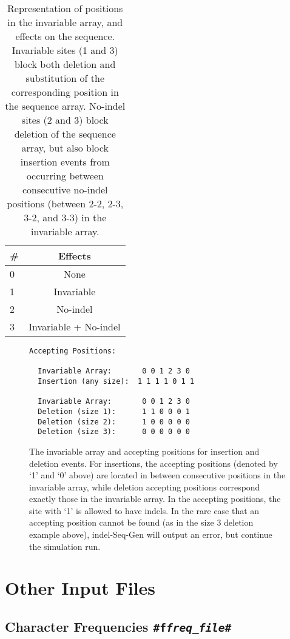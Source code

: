 \documentclass[10pt]{article}
\begin{document}
\begin{table}[Htbp]
\caption{Representation of positions in the invariable array, and effects on the sequence.
Invariable sites (1 and 3) block both deletion and substitution of the corresponding position in the sequence array.  No-indel sites (2 and 3) block deletion of the sequence array, but also block insertion events from occurring between consecutive no-indel positions (between 2-2, 2-3, 3-2, and 3-3) in the invariable array.}
\centering
\begin{tabular}{|l|c|}
\hline
\# & Effects \\
\hline
0 & None \\
1 & Invariable \\
2 & No-indel \\
3 & Invariable + No-indel  \\
\hline
\end{tabular}
\label{tab:invariable}
\end{table}

\begin{figure}[Htbp]
\begin{verbatim}
Accepting Positions:

  Invariable Array:       0 0 1 2 3 0
  Insertion (any size):  1 1 1 1 0 1 1

  Invariable Array:       0 0 1 2 3 0
  Deletion (size 1):      1 1 0 0 0 1
  Deletion (size 2):      1 0 0 0 0 0
  Deletion (size 3):      0 0 0 0 0 0

\end{verbatim}
\caption{The invariable array and accepting positions for insertion and deletion
events. For insertions, the accepting positions (denoted by `1' and `0' above) are located in between consecutive positions in the invariable array, while deletion accepting positions correspond exactly those in the invariable array.  In the accepting positions, the site with `1' is allowed to have indels. In the rare case that an accepting position cannot be found (as in the size 3 deletion example above), indel-Seq-Gen will output an error, but continue the simulation run.}
\label{fig:placement}
\end{figure}

\section{Other Input Files}

\subsection{Character Frequencies {\tt \#f{\it freq\_file}\#}}
\end{document}
